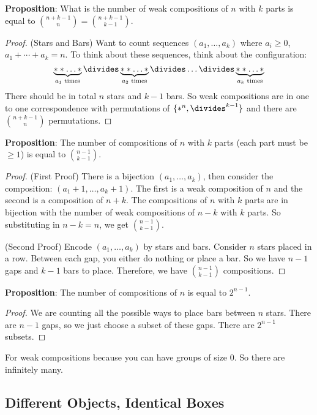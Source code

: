 \documentclass{report}
\begin{document}
\textbf{Proposition}: What is the number of weak compositions of $n$ with $k$ parts is equal to $\binom{n + k - 1}{n} = \binom{n + k - 1}{k - 1}$.
    \begin{proof}
        (Stars and Bars) Want to count sequences $(a_{1}, \ldots , a_{k})$ where $a_{i} \geq 0$, $a_{1} + \cdots +a_{k} = n$. To think about these sequences, think about the configuration:
            \begin{equation*}
               \underbrace{* * \ldots *}_{a_{1} \text{ times}} \divides\underbrace{* * \ldots  *}_{a_{2} \text{ times}} \divides  \ldots \divides\underbrace{* * \ldots  *}_{a_{k} \text{ times}}
            \end{equation*}
        There should be in total $n$ stars and $k - 1$ bars. So weak compositions are in one to one correspondence with permutations of $\{*^{n}, \divides^{k - 1}\}$ and there are $\binom{n + k - 1}{n}$ permutations.
    \end{proof}

\textbf{Proposition}: The number of compositions of $n$ with $k$ parts (each part must be $\geq 1$) is equal to $\binom{n - 1}{k - 1}$.
    \begin{proof}
        (First Proof) There is a bijection $(a_{1}, \ldots , a_{k})$, then consider the composition: $(a_{1} + 1, \ldots , a_{k} + 1)$. The first is a weak composition of $n$ and the second is a composition of $n + k$. The compositions of $n$ with $k$ parts are in bijection with the number of weak compositions of $n - k$ with $k$ parts. So substituting in $n - k = n$, we get $\binom{n - 1}{k - 1}$.

        (Second Proof) Encode $(a_{1}, \ldots , a_{k})$ by stars and bars. Consider $n$ stars placed in a row. Between each gap, you either do nothing or place a bar. So we have $n - 1$ gaps and $k - 1$ bars to place. Therefore, we have $\binom{n - 1}{k - 1}$ compositions.
    \end{proof} 

\textbf{Proposition}: The number of compositions of $n$ is equal to $2^{n - 1}$.
    \begin{proof}
        We are counting all the possible ways to place bars between $n$ stars. There are $n - 1$ gaps, so we just choose a subset of these gaps. There are $2^{n - 1}$ subsets.
    \end{proof}

For weak compositions because you can have groups of size $0$. So there are infinitely many.

\begin{topic}
    \section{Different Objects, Identical Boxes}
\end{topic}
\end{document}
